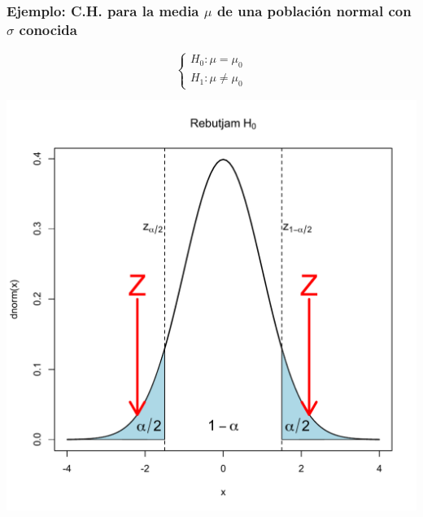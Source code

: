 \documentclass[12pt,t]{beamer}\usepackage[]{graphicx}\usepackage[]{color}
\theoremstyle{plain}
\theoremstyle{definition}
\begin{document}
\begin{frame}
\frametitle{Ejemplo: C.H. para la media   $\mu$ de una población   normal con $\sigma$ conocida}

\vspace*{-0.75cm}

$$
\left\{\begin{array}{l}
H_{0}:\mu=\mu_{0}\\ H_{1}:\mu\neq\mu_{0}
\end{array}
\right.
$$
\begin{center}
\includegraphics[width=0.7\linewidth]{rebutjamH0z2.pdf}
\end{center}

\end{frame}
\end{document}
